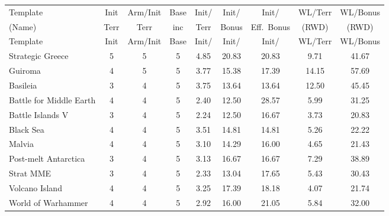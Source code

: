 \scriptsize
\begin{longtable}{|l|c|c|c|c|c|c|c|c|}
\hline
\rowcolor{Baby_Blue}
Template & Init & Arm/\newline Init & Base & Init/ & Init/ & Init/ & WL/\newline Terr & WL/\newline Bonus \\ 
\rowcolor{Baby_Blue}
(Name)   & Terr & Terr             & inc  & Terr  & Bonus & Eff.\ Bonus & (RWD) & (RWD) \\ \hline\hline
\endfirsthead
\hline
\rowcolor{Baby_Blue}
Template & Init & Arm/\newline Init & Base & Init/ & Init/ & Init/ & WL/\newline Terr & WL/\newline Bonus \\ \hline\hline
\endhead
Strategic Greece          & 5 & 5 & 5 & 4.85 & 20.83 & 20.83 & 9.71 & 41.67 \\ \hline
Guiroma                   & 4 & 5 & 5 & 3.77 & 15.38 & 17.39 & 14.15 & 57.69 \\ \hline\hline\hline
Basileia                  & 3 & 4 & 5 & 3.75 & 13.64 & 13.64 & 12.50 & 45.45 \\ \hline
Battle for Middle Earth   & 4 & 4 & 5 & 2.40 & 12.50 & 28.57 & 5.99 & 31.25 \\ \hline
Battle Islands V          & 3 & 4 & 5 & 2.24 & 12.50 & 16.67 & 3.73 & 20.83 \\ \hline
Black Sea                 & 4 & 4 & 5 & 3.51 & 14.81 & 14.81 & 5.26 & 22.22 \\ \hline
Malvia                    & 4 & 4 & 5 & 3.10 & 14.29 & 16.00 & 4.65 & 21.43 \\ \hline
Post-melt Antarctica      & 3 & 4 & 5 & 3.13 & 16.67 & 16.67 & 7.29 & 38.89 \\ \hline
Strat MME                 & 3 & 4 & 5 & 2.33 & 13.04 & 17.65 & 5.43 & 30.43 \\ \hline
Volcano Island            & 4 & 4 & 5 & 3.25 & 17.39 & 18.18 & 4.07 & 21.74 \\ \hline
World of Warhammer        & 4 & 4 & 5 & 2.92 & 16.00 & 21.05 & 5.84 & 32.00 \\ \hline\hline\hline

\end{longtable}
